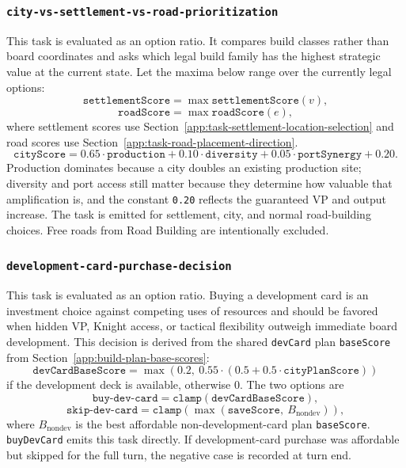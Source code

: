 \documentclass[letter,  12 pt]{article}
\begin{document}
\subsubsection{\texttt{city-vs-settlement-vs-road-prioritization}}
\label{app:task-city-vs-settlement-vs-road-prioritization}
This task is evaluated as an option ratio.
It compares build classes rather than board coordinates and asks which legal build family has the highest strategic value at the current state. Let the maxima below range over the currently legal options:
\[
\texttt{settlementScore} = \max \texttt{settlementScore}(v),
\]
\[
\texttt{roadScore} = \max \texttt{roadScore}(e),
\]
where settlement scores use Section~\ref{app:task-settlement-location-selection} and road scores use Section~\ref{app:task-road-placement-direction}.
\[
\texttt{cityScore}
= 0.65 \cdot \texttt{production}
+ 0.10 \cdot \texttt{diversity}
+ 0.05 \cdot \texttt{portSynergy}
+ 0.20.
\]
Production dominates because a city doubles an existing production site; diversity and port access still matter because they determine how valuable that amplification is, and the constant \texttt{0.20} reflects the guaranteed VP and output increase.
The task is emitted for settlement, city, and normal road-building choices. Free roads from Road Building are intentionally excluded.

\subsubsection{\texttt{development-card-purchase-decision}}
\label{app:task-development-card-purchase-decision}
This task is evaluated as an option ratio.
Buying a development card is an investment choice against competing uses of resources and should be favored when hidden VP, Knight access, or tactical flexibility outweigh immediate board development.
This decision is derived from the shared \texttt{devCard} plan \texttt{baseScore} from Section~\ref{app:build-plan-base-scores}:
\[
\texttt{devCardBaseScore}
= \max(0.2,\ 0.55 \cdot (0.5 + 0.5 \cdot \texttt{cityPlanScore}))
\]
if the development deck is available, otherwise $0$. The two options are
\[
\texttt{buy-dev-card} = \texttt{clamp}(\texttt{devCardBaseScore}),
\]
\[
\texttt{skip-dev-card}
= \texttt{clamp}(\max(\texttt{saveScore},\ B_{\text{nondev}})),
\]
where $B_{\text{nondev}}$ is the best affordable non-development-card plan \texttt{baseScore}.
\texttt{buyDevCard} emits this task directly. If development-card purchase was affordable but skipped for the full turn, the negative case is recorded at turn end.
\end{document}
